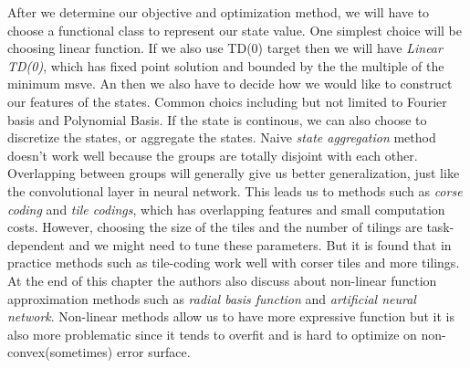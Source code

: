 \documentclass[12pt,a4paper]{article}
\begin{document}
After we determine our objective and optimization method, we will have to choose a functional class to represent our state value. One simplest choice will be choosing linear function. If we also use TD(0) target then we will have \textit{Linear TD(0)}, which has fixed point solution and bounded by the the multiple of the minimum msve. An then we also have to decide how we would like to construct our features of the states. Common choics including but not limited to Fourier basis and Polynomial Basis. If the state is continous, we can also choose to discretize the states, or aggregate the states. Naive \textit{state aggregation} method doesn't work well because the groups are totally disjoint with each other. Overlapping between groups will generally give us better generalization, just like the convolutional layer in neural network. This leads us to methods such as \textit{corse coding} and \textit{tile codings}, which has overlapping features and small computation costs. However, choosing the size of the tiles and the number of tilings are task-dependent and we might need to tune these parameters. But it is found that in practice methods such as tile-coding work well with corser tiles and more tilings.\\

At the end of this chapter the authors also discuss about non-linear function approximation methods such as \textit{radial basis function} and \textit{artificial neural network}. Non-linear methods allow us to have more expressive function but it is also more problematic since it tends to overfit and is hard to optimize on non-convex(sometimes) error surface.
\end{document}
